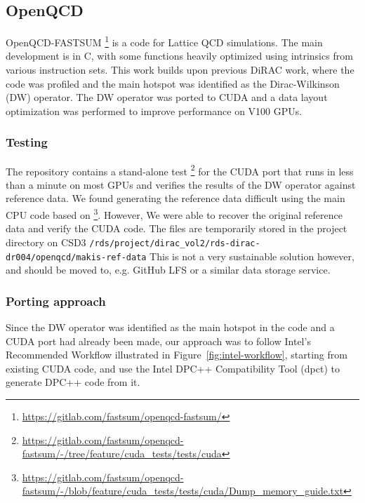 
\subsection{OpenQCD}\label{sec:openqcd}

OpenQCD-FASTSUM \footnote{\url{https://gitlab.com/fastsum/openqcd-fastsum/}} is a code for Lattice QCD simulations. The main development is in C, with some functions heavily optimized using intrinsics from various instruction sets. This work builds upon previous DiRAC work, where the code was profiled and the main hotspot was identified as the Dirac-Wilkinson (DW) operator. The DW operator was ported to CUDA and a data layout optimization was performed to improve performance on V100 GPUs.

\subsubsection{Testing}

The repository contains a stand-alone test \footnote{\url{https://gitlab.com/fastsum/openqcd-fastsum/-/tree/feature/cuda_tests/tests/cuda}} for the CUDA port that runs in less than a minute on most GPUs and verifies the results of the DW operator against reference data. We found generating the reference data difficult using the main CPU code based on \footnote{\url{https://gitlab.com/fastsum/openqcd-fastsum/-/blob/feature/cuda_tests/tests/cuda/Dump\_memory\_guide.txt}}. However, We were able to recover the original reference data and verify the CUDA code. The files are temporarily stored in the project directory on CSD3 \texttt{/rds/project/dirac\_vol2/rds-dirac-dr004/openqcd/makis-ref-data} This is not a very sustainable solution however, and should be moved to, e.g. GitHub LFS or a similar data storage service.


\label{sec:openqcd_porting}
\subsubsection{Porting approach}

Since the DW operator was identified as the main hotspot in the code and a CUDA port had already been made, our approach was to follow Intel's Recommended Workflow illustrated in Figure~\ref{fig:intel-workflow}, starting from existing CUDA code, and use the Intel DPC++ Compatibility Tool (dpct) to generate DPC++ code from it.

